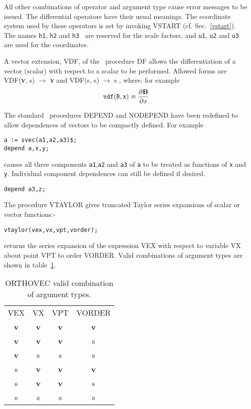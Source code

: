 All other combinations of operator and argument type cause error
messages to be issued.  The differential operators have their usual
meanings.  The coordinate system used by these operators is
set by invoking  VSTART (cf. Sec.~\ref{vstart}).  The names {\tt h1},
{\tt h2}  and {\tt h3 } are
reserved for the scale factors, and {\tt u1}, {\tt u2} and {\tt u3} are
used for the coordinates.

A vector extension, VDF, of the \REDUCE\ procedure DF allows the
differentiation of a vector (scalar) with respect to a scalar to be
performed.  Allowed forms are
VDF({\bf v}, s)  $\rightarrow$  {\bf v}   and
VDF(s, s)  $\rightarrow$   s ,
where, for example\\
\begin{eqnarray*}
{\tt vdf( B,x)} \equiv \frac{\partial {\bf B}}{\partial x}
\end{eqnarray*}

The standard \REDUCE\ procedures DEPEND and NODEPEND have been redefined
to allow dependences of vectors to be compactly
defined.  For example
\begin{verbatim}
a := svec(a1,a2,a3)$;
depend a,x,y;
\end{verbatim}
causes all three components {\tt a1},{\tt a2} and {\tt a3} of {\tt a}
to be treated as functions of {\tt x} and {\tt y}.
Individual component dependences can still be defined if desired.
\begin{verbatim}
depend a3,z;
\end{verbatim}

The procedure VTAYLOR gives truncated Taylor series expansions of scalar
or vector functions:-
\begin{verbatim}
vtaylor(vex,vx,vpt,vorder);
\end{verbatim}
returns the series expansion of the expression
VEX  with respect to variable VX
about point VPT  to order VORDER.  Valid
combinations of argument types are shown in table~\ref{ORTHOVEC:validexp}. \\

\begin{table}
\begin{center}
\begin{tabular}{cccc}
VEX & VX & VPT &  VORDER \\[2ex]
{\bf v} & {\bf v} &  {\bf v} &  {\bf v}\\
{\bf v} &  {\bf v} & {\bf v} & s\\
{\bf v} & s & s & s \\
s & {\bf v} &  {\bf v} & {\bf v}   \\
s & {\bf v} & {\bf v} & s\\
s & s & s & s\\
\end{tabular}
\end{center}
\caption{ORTHOVEC valid combination of argument types.}\label{ORTHOVEC:validexp}
\end{table}

